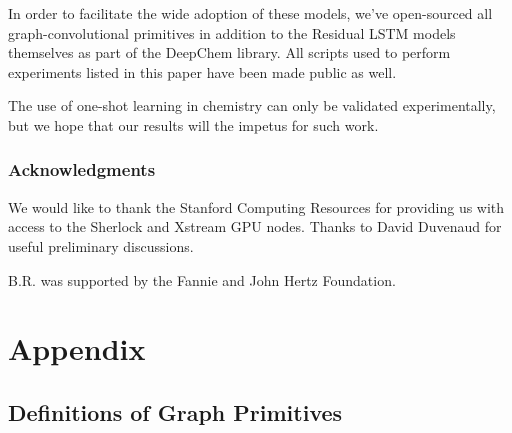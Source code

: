 \documentclass[journal=jacsat,manuscript=article]{achemso}
\begin{document}
In order to facilitate the wide adoption of these models, we've open-sourced all graph-convolutional primitives in addition to the Residual LSTM models themselves as part of the DeepChem library. All scripts used to perform experiments listed in this paper have been made public as well.

The use of one-shot learning in chemistry can only be validated experimentally, but we hope that our results will the impetus for such work.

\subsubsection*{Acknowledgments}

We would like to thank the Stanford Computing Resources for providing us with access to the Sherlock and Xstream GPU nodes. Thanks to David Duvenaud for useful preliminary discussions.

B.R. was supported by the Fannie and John Hertz Foundation.

\section{Appendix}

\subsection{Definitions of Graph Primitives}
\end{document}
